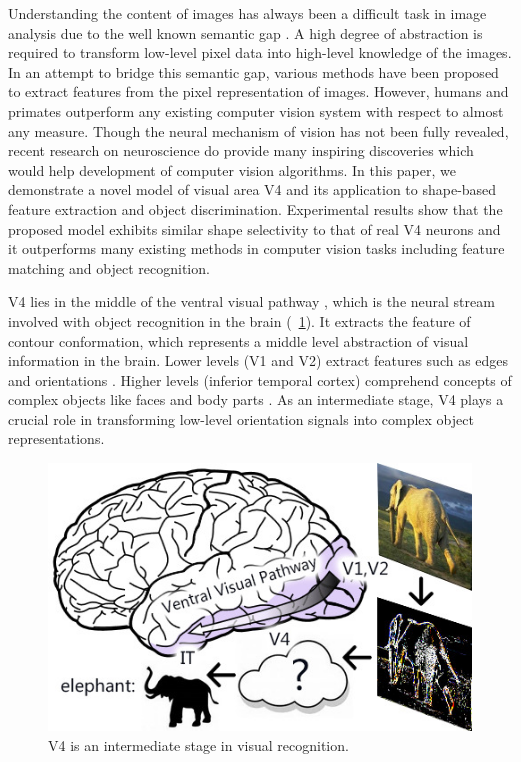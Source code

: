 \documentclass[twocolumn]{article}
\begin{document}
Understanding the content of images has always been a difficult task in image analysis due to the well known semantic gap \cite{smeulders2000}.
A high degree of abstraction is required to transform low-level pixel data into high-level knowledge of the images.
In an attempt to bridge this semantic gap, various methods have been proposed to extract features from the pixel representation of images.
However, humans and primates outperform any existing computer vision system with respect to almost any measure.
Though the neural mechanism of vision has not been fully revealed,
recent research on neuroscience do provide many inspiring discoveries which would help development of computer vision algorithms.
In this paper, we demonstrate a novel model of visual area V4 and its application to shape-based feature extraction and object discrimination.
Experimental results show that the proposed model exhibits similar shape selectivity to that of real V4 neurons
and it outperforms many existing methods in computer vision tasks including feature matching and object recognition. 

V4 lies in the middle of the ventral visual pathway \cite{ettlinger1990}, 
which is the neural stream involved with object recognition in the brain (\figurename~\ref{fig:1}).
It extracts the feature of contour conformation, which represents a middle level abstraction of visual information in the brain.
Lower levels (V1 and V2) extract features such as edges and orientations \cite{hubel1962}.
Higher levels (inferior temporal cortex) comprehend concepts of complex objects like faces and body parts \cite{bell2009}.
As an intermediate stage, V4 plays a crucial role in transforming low-level orientation signals into complex object representations.

\begin{figure}[!t]
\centerline{\includegraphics[width=0.8\linewidth]{images/fig1.jpg}} 
\caption{V4 is an intermediate stage in visual recognition.}
\label{fig:1}
\end{figure}
\end{document}
